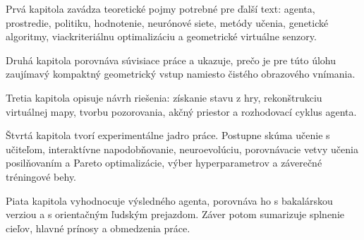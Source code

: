 Prvá kapitola zavádza teoretické pojmy potrebné pre ďalší text: agenta, prostredie, politiku, hodnotenie, neurónové siete, metódy učenia, genetické algoritmy, viackriteriálnu optimalizáciu a geometrické virtuálne senzory.

Druhá kapitola porovnáva súvisiace práce a ukazuje, prečo je pre túto úlohu zaujímavý kompaktný geometrický vstup namiesto čistého obrazového vnímania.

Tretia kapitola opisuje návrh riešenia: získanie stavu z hry, rekonštrukciu virtuálnej mapy, tvorbu pozorovania, akčný priestor a rozhodovací cyklus agenta.

Štvrtá kapitola tvorí experimentálne jadro práce. Postupne skúma učenie s učiteľom, interaktívne napodobňovanie, neuroevolúciu, porovnávacie vetvy učenia posilňovaním a Pareto optimalizácie, výber hyperparametrov a záverečné tréningové behy.

Piata kapitola vyhodnocuje výsledného agenta, porovnáva ho s bakalárskou verziou a s orientačným ľudským prejazdom. Záver potom sumarizuje splnenie cieľov, hlavné prínosy a obmedzenia práce.
